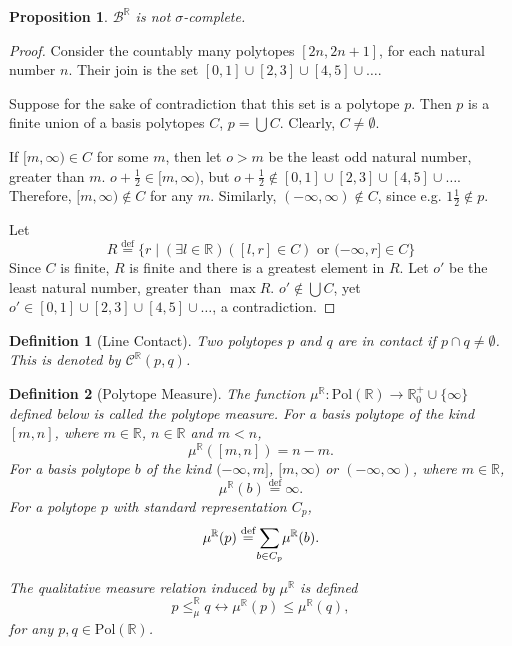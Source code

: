 \documentclass{article}
\newtheorem*{definition}{Definition}
\newtheorem*{proposition}{Proposition}
\newcommand{\R}{\mathbb{R}}
\newcommand{\B}{\mathcal{B}}
\newcommand{\bcont}{\mathcal{C}^\R}
\newcommand{\bmeasure}{\leq_\mu^\R}
\newcommand{\Pol}{\text{Pol}}
\newcommand{\eqdef}{\stackrel{\text{def}}{=}}
\begin{document}
\begin{proposition}
  $\B^\R$ is not $\sigma$-complete.
\end{proposition}
\begin{proof}
  Consider the countably many polytopes $[2n, 2n+1]$, for each natural number $n$. Their join is the set $[0, 1] \cup [2, 3] \cup [4, 5] \cup \dots$.

  Suppose for the sake of contradiction that this set is a polytope $p$. Then $p$ is a finite union of a basis polytopes $C$, $p = \bigcup C$. Clearly, $C \neq \emptyset$.

  If $[m, \infty) \in C$ for some $m$, then let $o > m$ be the least odd natural number, greater than $m$. $o + \frac{1}{2} \in [m, \infty)$, but $o + \frac{1}{2} \not \in [0, 1] \cup [2, 3] \cup [4, 5] \cup \dots$. Therefore, $[m, \infty) \not \in C$ for any $m$. Similarly, $(-\infty, \infty) \not \in C$, since e.g. $1\frac{1}{2} \not \in p$.

        Let
        \[
        R \eqdef \{r \mid (\exists l \in \R)([l, r] \in C) \text{ or } (-\infty, r] \in C\}
        \]
        Since $C$ is finite, $R$ is finite and there is a greatest element in $R$. Let $o'$ be the least natural number, greater than $\max R$. $o' \not \in \bigcup C$, yet $o' \in [0, 1] \cup [2, 3] \cup [4, 5] \cup \dots$, a contradiction.
\end{proof}

\begin{definition}[Line Contact]
Two polytopes $p$ and $q$ are \emph{in contact} if $p \cap q \neq \emptyset$. This is denoted by $\bcont(p, q)$.
\end{definition}

\begin{definition}[Polytope Measure]
  The function $\mu^\R:\Pol(\R) \rightarrow \R^+_0 \cup \{\infty\}$ defined below is called the \emph{polytope measure}. For a basis polytope of the kind $[m, n]$, where $m \in \R$, $n \in \R$ and $m < n$,
  \[\mu^\R([m, n]) = n - m.\]
  For a basis polytope $b$ of the kind $(-\infty, m]$, $[m, \infty)$ or $(-\infty, \infty)$, where $m \in \R$,
      \[\mu^\R(b) \eqdef \infty.\]
      For a polytope $p$ with standard representation $C_p$,
      \[\mu^\R(p) \eqdef \sum_{\mathclap{b \in C_p}} \mu^\R(b).\]

The \emph{qualitative measure relation induced by} $\mu^\R$ is defined
\begin{equation*}
  p \bmeasure q \leftrightarrow \mu^\R(p) \leq \mu^\R(q),
\end{equation*}
  for any $p, q \in \Pol(\R)$.
\end{definition}
\end{document}
